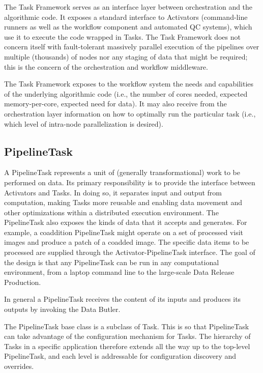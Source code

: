 \documentclass[DM,lsstdraft,toc]{lsstdoc}
\begin{document}
The Task Framework serves as an interface layer between orchestration
and the algorithmic code. It exposes a standard interface to Activators
(command-line runners as well as the workflow component and automated QC
systems), which use it to execute the code wrapped in Tasks. The Task Framework
does not concern itself with fault-tolerant massively parallel execution of the
pipelines over multiple (thousands) of nodes nor any staging of data that might
be required; this is the concern of the orchestration and workflow middleware.

The Task Framework exposes to the workflow system the needs and capabilities
of the underlying algorithmic code (i.e., the number of cores needed, expected
memory-per-core, expected need for data). It may also receive from the
orchestration layer information on how to optimally run the particular task
(i.e., which level of intra-node parallelization is desired).


\subsection{PipelineTask}\label{pipelinetask}

A PipelineTask represents a unit of (generally transformational) work to be
performed on data.  Its primary responsibility is to provide the interface
between Activators and Tasks.  In doing so, it separates input and output from
computation, making Tasks more reusable and enabling data movement and other
optimizations within a distributed execution environment.  The PipelineTask also
exposes the kinds of data that it accepts and generates.  For example, a
coaddition PipelineTask might operate on a set of processed visit images and
produce a patch of a coadded image.  The specific data items to be processed
are supplied through the Activator-PipelineTask interface.  The goal of the
design is that any PipelineTask can be run in any computational environment,
from a laptop command line to the large-scale Data Release Production.

In general a PipelineTask receives the content of its inputs and produces its
outputs by invoking the Data Butler.

The PipelineTask base class is a subclass of Task. This is so that PipelineTask can
take advantage of the configuration mechanism for Tasks. The hierarchy of Tasks
in a specific application therefore extends all the way up to the top-level
PipelineTask, and each level is addressable for configuration discovery and
overrides.
\end{document}
